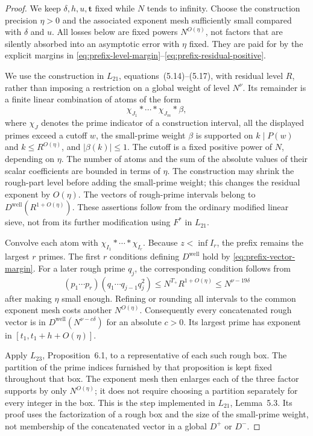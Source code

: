 \begin{proof}
We keep $\delta,h,u,\boldsymbol t$ fixed while $N$ tends to infinity.
Choose the construction precision $\eta>0$ and the associated exponent
mesh sufficiently small compared with $\delta$ and $u$.
All losses below are fixed powers $N^{O(\eta)}$, not factors that are
silently absorbed into an asymptotic error with $\eta$ fixed.
They are paid for by the explicit margins in
\eqref{eq:prefix-level-margin}--\eqref{eq:prefix-residual-positive}.

We use the construction in $L_{21}$, equations~(5.14)--(5.17),
with residual level $R$, rather than imposing a restriction on a
global weight of level $N^\nu$. Its remainder is a finite linear
combination of atoms of the form
\begin{equation}\label{eq:prefix-atom}
 \chi_{J_1}*\cdots*\chi_{J_m}*\beta,
\end{equation}
where $\chi_J$ denotes the prime indicator of a construction interval,
all the displayed primes exceed a cutoff $w$, the small-prime weight
$\beta$ is supported on $k\mid P(w)$ and $k\le R^{O(\eta)}$, and
$|\beta(k)|\le1$. The cutoff is a fixed positive power of $N$,
depending on $\eta$. The number of atoms and the sum of the absolute
values of their scalar coefficients are bounded in terms of $\eta$.
The construction may shrink the rough-part level before adding the
small-prime weight; this changes the residual exponent by $O(\eta)$.
The vectors of rough-prime intervals belong to
$D^{\mathrm{well}}(R^{1+O(\eta)})$. These assertions follow from
the ordinary modified linear sieve, not from its further modification
using $F^*$ in $L_{21}$.

Convolve each atom with $\chi_{I_1}*\cdots*\chi_{I_r}$.
Because $z<\inf I_r$, the prefix remains the largest $r$ primes.
The first $r$ conditions defining $D^{\mathrm{well}}$ hold by
\eqref{eq:prefix-vector-margin}. For a later rough prime $q_j$,
the corresponding condition follows from
\[
 (p_1\cdots p_r)(q_1\cdots q_{j-1}q_j^2)
 \le N^{T_+}R^{1+O(\eta)}
 \le N^{\nu-19\delta}
\]
after making $\eta$ small enough. Refining or rounding all intervals
to the common exponent mesh costs another $N^{O(\eta)}$.
Consequently every concatenated rough vector is in
$D^{\mathrm{well}}(N^{\nu-c\delta})$ for an absolute $c>0$.
Its largest prime has exponent in $[t_1,t_1+h+O(\eta)]$.

Apply $L_{23}$, Proposition~6.1, to a representative of each such
rough box. The partition of the prime indices furnished by that
proposition is kept fixed throughout that box. The exponent mesh
then enlarges each of the three factor supports by only
$N^{O(\eta)}$; it does not require choosing a partition separately
for every integer in the box. This is the step implemented in
$L_{21}$, Lemma~5.3. Its proof uses the factorization of a rough
box and the size of the small-prime weight, not membership of the
concatenated vector in a global $D^+$ or $D^-$.


\end{proof}
